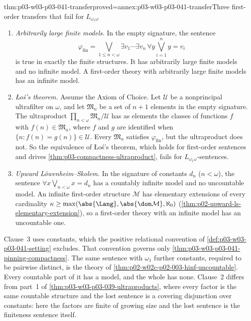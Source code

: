 \begin{hbtheorem}{thm:p03-w03-p03-041-transfer}{proved=annex:p03-w03-p03-041-transfer}{Three first-order transfers that fail for \(L_{\omega_1\omega}\)}
\begin{enumerate}
\item \emph{Arbitrarily large finite models.} In the empty signature, the
      sentence
      \[
       \varphi_{\mathrm{fin}}=\bigvee_{1\leq n<\omega}
          \exists v_1\cdots\exists v_n\,\forall y\bigvee_{i=1}^{n}y=v_i
      \]
      is true in exactly the finite structures. It has arbitrarily large
      finite models and no infinite model. A first-order theory with
      arbitrarily large finite models has an infinite model.
\item \emph{\L o\'s's theorem.} Assume the Axiom of Choice. Let
      \(\mathcal U\) be a nonprincipal ultrafilter on \(\omega\), and let
      \(\mathfrak M_n\) be a set of \(n+1\) elements in the empty
      signature. The ultraproduct \(\prod_{n<\omega}\mathfrak M_n/\mathcal U\)
      has as elements the classes of functions \(f\) with
      \(f(n)\in\mathfrak M_n\), where \(f\) and \(g\) are identified when
      \(\{n:f(n)=g(n)\}\in\mathcal U\). Every \(\mathfrak M_n\) satisfies
      \(\varphi_{\mathrm{fin}}\), but the ultraproduct does not. So the
      equivalence of \L o\'s's theorem, which holds for first-order
      sentences and drives \cref{thm:p03-compactness-ultraproduct}, fails
      for \(L_{\omega_1\omega}\)-sentences.
\item \emph{Upward L\"owenheim--Skolem.} In the signature of constants
      \(d_n\) (\(n<\omega\)), the sentence
      \(\forall x\bigvee_{n<\omega}x=d_n\) has a countably infinite model
      and no uncountable model. An infinite first-order structure
      \(\mathcal M\) has elementary extensions of every cardinality
      \(\kappa\geq\max(\abs{\Lang},\abs{\dom\mathcal M},\aleph_0)\)
      (\cref{thm:p02-upward-ls-elementary-extension}), so a first-order
      theory with an infinite model has an uncountable one.
\end{enumerate}
\end{hbtheorem}

Clause~3 uses constants, which the positive relational convention of
\cref{def:p03-w03-p03-041-setting} excludes. That convention governs only
\cref{thm:p03-w03-p03-041-pinning-compactness}. The same sentence with
\(\omega_1\) further constants, required to be pairwise distinct, is the
theory of \cref{thm:p02-w02c-p02-003-hinf-uncountable}. Every countable
part of it has a model, and the whole has none.
Clause~2 differs from part~1 of \cref{thm:p03-w03-p03-039-ultraproducts},
where every factor is the same countable structure and the lost sentence
is a covering disjunction over constants: here the factors are finite of
growing size and the lost sentence is the finiteness sentence itself.

